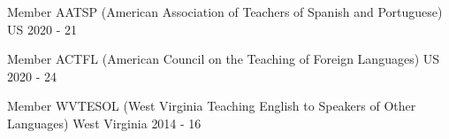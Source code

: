 


\begin{cvhonors}


\cvhonor
{Member} %
{AATSP (American Association of Teachers of Spanish and Portuguese)} %
{US} %
{2020 - 21} %


\cvhonor
{Member} %
{ACTFL (American Council on the Teaching of Foreign Languages)} %
{US} %
{2020 - 24} %


\cvhonor
{Member} %
{WVTESOL (West Virginia Teaching English to Speakers of Other Languages)} %
{West Virginia} %
{2014 - 16} %


\end{cvhonors}